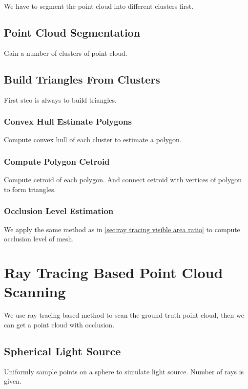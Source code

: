 \documentclass[11pt, a4paper,oneside,chapterprefix=false]{scrbook}
\begin{document}
We have to segment the point cloud into different clusters first.

\subsection{Point Cloud Segmentation}

Gain a number of clusters of point cloud.

\subsection{Build Triangles From Clusters}

First steo is always to build triangles.

\subsubsection{Convex Hull Estimate Polygons}

Compute convex hull of each cluster to estimate a polygon.

\subsubsection{Compute Polygon Cetroid}

Compute cetroid of each polygon. And connect cetroid with vertices of polygon to form triangles.

\subsubsection{Occlusion Level Estimation}

We apply the same method as in \ref{sec:ray tracing visible area ratio} to compute occlusion level of mesh.

\section{Ray Tracing Based Point Cloud Scanning} \label{sec:ray tracing point cloud scanning}

We use ray tracing based method to scan the ground truth point cloud, then we can get a point cloud with occlusion.

\subsection{Spherical Light Source}

Uniformly sample points on a sphere to simulate light source. Number of rays is given.
\end{document}
